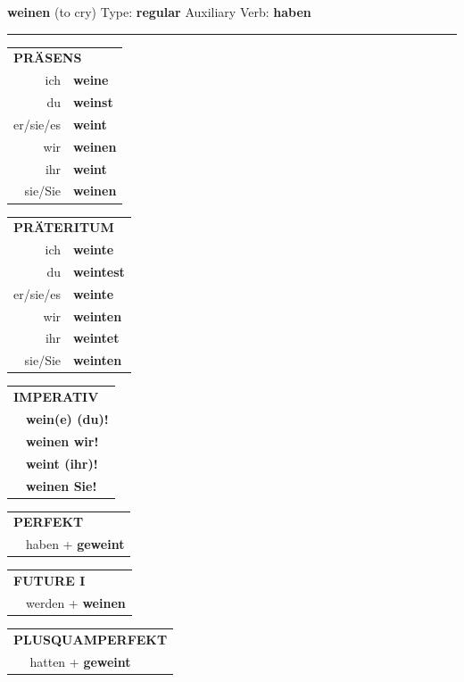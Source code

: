 \documentclass[10pt,a4paper]{revtex4-2}
\begin{document}
\begin{verbbox}
{\Large \bf weinen} (to cry) \hfill Type: \textbf{regular} \hfill Auxiliary Verb: \textbf{haben}

\vspace{5pt}
\hrule
\vspace{5pt}

\begin{tabular}{rl}
\multicolumn{2}{l}{\textbf{PRÄSENS}}\\
ich & \textbf{weine}\\
du & \textbf{weinst}\\
er/sie/es & \textbf{weint}\\
wir & \textbf{weinen}\\
ihr & \textbf{weint}\\
sie/Sie & \textbf{weinen}\\
\end{tabular}
\hfill
\begin{tabular}{rl}
\multicolumn{2}{l}{\textbf{PRÄTERITUM}}\\
ich & \textbf{weinte}\\
du & \textbf{weintest}\\
er/sie/es & \textbf{weinte}\\
wir & \textbf{weinten}\\
ihr & \textbf{weintet}\\
sie/Sie & \textbf{weinten}\\
\end{tabular}
\hfill
\begin{tabular}{rl}
\multicolumn{2}{l}{\textbf{IMPERATIV}}\\
& \textbf{wein(e) (du)!}\\
& \textbf{weinen wir!}\\
& \textbf{weint (ihr)!}\\
& \textbf{weinen Sie!}\\
\end{tabular}

\vspace{10pt}

\begin{tabular}{rl}
\multicolumn{2}{l}{\textbf{PERFEKT}}\\
& haben + \textbf{geweint}\\
\end{tabular}
\hfill
\begin{tabular}{rl}
\multicolumn{2}{l}{\textbf{FUTURE I}}\\
& werden + \textbf{weinen}\\
\end{tabular}
\hfill
\begin{tabular}{rl}
\multicolumn{2}{l}{\textbf{PLUSQUAMPERFEKT}}\\
& hatten + \textbf{geweint}\\
\end{tabular}


\end{verbbox}
\end{document}

